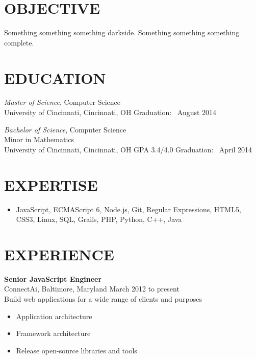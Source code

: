 \documentclass[11pt, line]{res}
\begin{document}
	\address{8228 Melrose Ln\\ Maineville, OH 45039\\ 513-259-0656\\ ross@rhadden.com}

	\begin{resume}
		\section{OBJECTIVE}
			Something something something darkside.  Something something something complete.

		\section{EDUCATION}
				\textit{Master of Science}, Computer Science \\
				University of Cincinnati, Cincinnati, OH
				\hfill
				Graduation: \ August 2014

				\textit{Bachelor of Science}, Computer Science \\
				Minor in Mathematics \\
				University of Cincinnati, Cincinnati, OH
				\hspace{16pt}
				GPA 3.4/4.0
				\hfill
				Graduation: \ April 2014

		\section{EXPERTISE}
			\begin{itemize}[leftmargin=0pt]
				\item[]
					JavaScript,
					ECMAScript 6,
					Node.js,
					Git,
					Regular Expressions,
					HTML5,
					CSS3,
					Linux,
					SQL,
					Grails,
					PHP,
					Python,
					C++,
					Java
			\end{itemize}

		\section{EXPERIENCE}
				\textbf{Senior JavaScript Engineer} \\
				ConnectAi,\; Baltimore, Maryland
					\hfill March 2012 to present \\
				Build web applications for a wide range of clients and purposes

				\begin{itemize}
					\item Application architecture
					\item Framework architecture
					\item Release open-source libraries and tools
				\end{itemize}


\end{resume}
\end{document}
